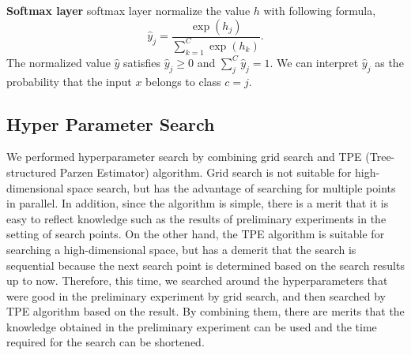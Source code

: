\documentclass[useamsfonts]{pasj01}
\begin{document}
{\bf Softmax layer}
softmax layer normalize the value $h$ with following formula,
\begin{equation}
    \hat{y}_j = \frac{\exp \left( h_j \right)}{\sum_{k=1}^C \exp \left( h_k \right)}.
\end{equation}
The normalized value $\hat{y}$ satisfies $\hat{y}_j \geq 0$ and $\sum_j^C \hat{y}_j =1$.
We can interpret $\hat{y}_j$ as the probability that the input $x$ belongs to  class $c=j$.
  
\subsection{Hyper Parameter Search}\label{hyperparametersearch}
We performed hyperparameter search by combining grid search and TPE (Tree-structured Parzen Estimator) algorithm.
Grid search is not suitable for high-dimensional space search, but has the advantage of searching for multiple points in parallel.
In addition, since the algorithm is simple, there is a merit that it is easy to reflect knowledge such as the results of preliminary experiments in the setting of search points.
On the other hand, the TPE algorithm is suitable for searching a high-dimensional space, but has a demerit that the search is sequential because the next search point is determined based on the search results up to now.
Therefore, this time, we searched around the hyperparameters that were good in the preliminary experiment by grid search, and then searched by TPE algorithm based on the result.
By combining them, there are merits that the knowledge obtained in the preliminary experiment can be used and the time required for the search can be shortened.
\end{document}
